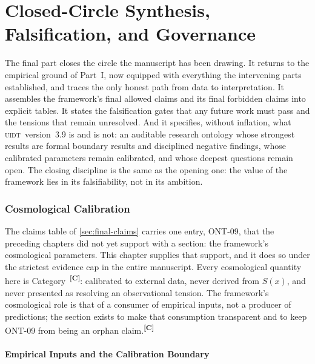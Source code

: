 \documentclass[12pt,a4paper,twoside]{article}
\theoremstyle{plain}
\theoremstyle{definition}
\theoremstyle{remark}
\newcommand{\UIDT}{\textsc{uidt}}
\newcommand{\catmark}[1]{\textsuperscript{\textsf{\textbf{[#1]}}}}
\newcommand{\Sx}{S(x)}
\begin{document}
\part{Closed-Circle Synthesis, Falsification, and Governance}
\label{part:synthesis-governance}

\noindent The final part closes the circle the manuscript has been drawing. It returns to the empirical ground of Part~I, now equipped with everything the intervening parts established, and traces the only honest path from data to interpretation. It assembles the framework's final allowed claims and its final forbidden claims into explicit tables. It states the falsification gates that any future work must pass and the tensions that remain unresolved. And it specifies, without inflation, what \UIDT\ version~3.9 is and is not: an auditable research ontology whose strongest results are formal boundary results and disciplined negative findings, whose calibrated parameters remain calibrated, and whose deepest questions remain open. The closing discipline is the same as the opening one: the value of the framework lies in its falsifiability, not in its ambition.

\section{Cosmological Calibration}
\label{sec:cosmological-calibration}

\noindent The claims table of \cref{sec:final-claims} carries one entry, ONT-09, that the preceding chapters did not yet support with a section: the framework's cosmological parameters. This chapter supplies that support, and it does so under the strictest evidence cap in the entire manuscript. Every cosmological quantity here is Category~\catmark{C}: calibrated to external data, never derived from $\Sx$, and never presented as resolving an observational tension. The framework's cosmological role is that of a consumer of empirical inputs, not a producer of predictions; the section exists to make that consumption transparent and to keep ONT-09 from being an orphan claim.\catmark{C}

\subsection{Empirical Inputs and the Calibration Boundary}
\label{subsec:cosmology-inputs}
\end{document}
